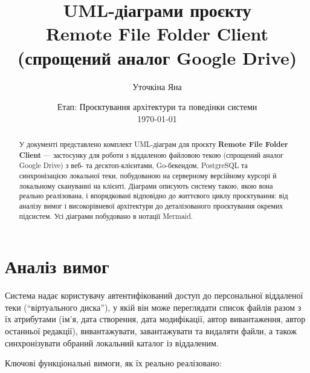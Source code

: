 \documentclass[12pt,a4paper]{article}
\title{\textbf{UML-діаграми проєкту\\[2pt] \large Remote File Folder Client\\(спрощений аналог Google Drive)}}
\author{Уточкіна Яна}
\date{Етап: Проєктування архітектури та поведінки системи \\ \today}
\begin{document}
\maketitle

\begin{abstract}
\noindent
У документі представлено комплект UML-діаграм для проєкту \textbf{Remote File Folder Client} --- застосунку для роботи з віддаленою файловою текою (спрощений аналог Google Drive) з веб- та десктоп-клієнтами, Go-бекендом, PostgreSQL та синхронізацією локальної теки, побудованою на серверному версійному курсорі й локальному скануванні на клієнті. Діаграми описують систему такою, якою вона реально реалізована, і впорядковані відповідно до життєвого циклу проєктування: від аналізу вимог і високорівневої архітектури до деталізованого проєктування окремих підсистем. Усі діаграми побудовано в нотації Mermaid.
\end{abstract}

\tableofcontents
\newpage

\section{Аналіз вимог}

Система надає користувачу автентифікований доступ до персональної віддаленої теки (``віртуального диска''), у якій він може переглядати список файлів разом з їх атрибутами (ім'я, дата створення, дата модифікації, автор вивантаження, автор останньої редакції), вивантажувати, завантажувати та видаляти файли, а також синхронізувати обраний локальний каталог із віддаленим.

Ключові функціональні вимоги, як їх реально реалізовано:
\end{document}
